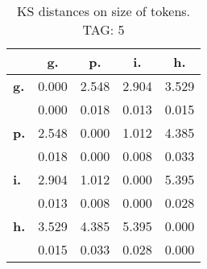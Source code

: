 \begin{table}[h!]
\begin{center}
\begin{tabular}{| l || c | c | c | c |}\hline
 & {\bf g.} & {\bf p.} & {\bf i.} & {\bf h.} \\\hline\hline
{\bf g.} & 0.000 & 2.548 & 2.904 & 3.529 \\
{\bf } & 0.000 & 0.018 & 0.013 & 0.015 \\\hline
{\bf p.} & 2.548 & 0.000 & 1.012 & 4.385 \\
{\bf } & 0.018 & 0.000 & 0.008 & 0.033 \\\hline
{\bf i.} & 2.904 & 1.012 & 0.000 & 5.395 \\
{\bf } & 0.013 & 0.008 & 0.000 & 0.028 \\\hline
{\bf h.} & 3.529 & 4.385 & 5.395 & 0.000 \\
{\bf } & 0.015 & 0.033 & 0.028 & 0.000 \\\hline
\end{tabular}
\caption{KS distances on size of tokens. TAG: 5}
\end{center}
\end{table}
